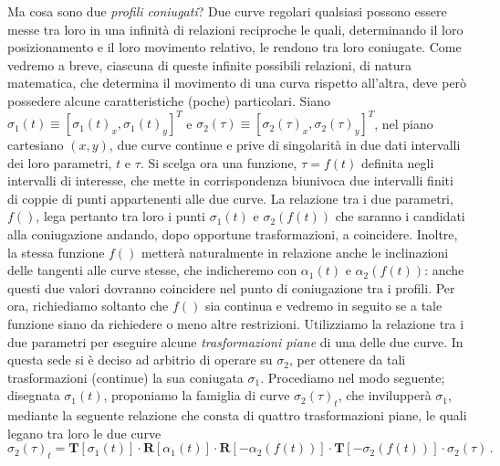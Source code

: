 \noindent Ma cosa sono due {\em profili coniugati}?
Due curve regolari qualsiasi possono essere messe tra loro in una
infinit\`a di relazioni reciproche le quali, determinando il loro
posizionamento e il loro movimento relativo,
le rendono tra loro coniugate. 
Come vedremo a breve, ciascuna di queste infinite possibili relazioni, di
natura matematica, che determina il movimento di una curva rispetto all'altra,
deve per\`o possedere alcune caratteristiche (poche) particolari.
Siano $\sigma_1(t)\equiv [\sigma_1(t)_x,\sigma_1(t)_y]^T$ e
$\sigma_2(\tau)\equiv [\sigma_2(\tau)_x,\sigma_2(\tau)_y]^T$,
nel piano cartesiano $(x,y)$, due curve continue e prive di singolarit\`a
in due dati intervalli dei loro parametri, $t$ e $\tau$.
Si scelga ora una funzione, $\tau=f(t)$ definita negli intervalli di interesse,
che mette in corrispondenza biunivoca due intervalli finiti
di coppie di punti appartenenti alle due curve. La relazione tra i due
parametri, $f()$, lega pertanto tra loro i punti
$\sigma_1(t)$ e $\sigma_2(f(t))$ che saranno i candidati
alla coniugazione andando, dopo opportune trasformazioni, a coincidere.
Inoltre, la stessa funzione $f()$ metter\`a naturalmente in relazione anche
le inclinazioni delle tangenti alle curve stesse, che
indicheremo con $\alpha_1(t)$ e $\alpha_2(f(t))$:
anche questi due valori dovranno coincidere nel punto
di coniugazione tra i profili.
Per ora, richiediamo soltanto che $f()$ sia continua e vedremo in seguito
se a tale funzione siano da richiedere o meno altre restrizioni.
Utilizziamo la relazione tra i due parametri per eseguire
alcune {\em trasformazioni piane} di una delle due
curve. In questa sede si \`e deciso ad arbitrio di operare su $\sigma_2$, per
ottenere da tali trasformazioni (continue) la sua coniugata $\sigma_1$.
Procediamo nel modo
seguente; disegnata $\sigma_1(t)$, proponiamo la famiglia di curve
${\sigma_2(\tau)}_t$, che invilupper\`a $\sigma_1$,
mediante la seguente relazione che consta di quattro trasformazioni piane,
le quali legano tra loro le due curve
\begin{equation}
{\sigma_2(\tau)}_t = 
 {\bm T}[\sigma_1(t)]\cdot {\bm R}[\alpha_1(t)]
\cdot{\bm R}[-\alpha_2(f(t))]\cdot
 {\bm T} [-\sigma_2(f(t))]\cdot \sigma_2(\tau)\,.
\label{eq:inviluppo}
\end{equation}

